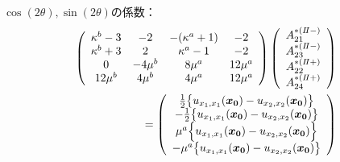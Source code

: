 $\cos(2\theta),\sin(2\theta)$の係数：
\begin{align}
	\left(
	\begin{array}{cccc}
		\kappa^b-3& -2 & -(\kappa^a+1) & -2 \\
		\kappa^b+3 & 2 & \kappa^a-1 & -2 \\
		0 & -4\mu^{b} & 8\mu^{a} & 12\mu^{a} \\
		12\mu^{b} & 4\mu^{b} & 4\mu^{a} & 12\mu^{a} \\
	\end{array}
	\right)
	\left(
	\begin{array}{c}
		A_{21}^{*(I\hspace{-.15em}I-)} \\
	 	A_{23}^{*(I\hspace{-.15em}I-)} \\
		A_{22}^{*(I\hspace{-.15em}I+)}\\
	 	A_{24}^{*(I\hspace{-.15em}I+)} \\
	\end{array}
	\right)
	\nonumber
	\\
	=
	\left(
	\begin{array}{c}
		\frac{1}{2}\bigl\{u_{x_{1},x_{1}}(\bm{x_{0}})-u_{x_{2},x_{2}}(\bm{x_{0}})\bigr\} \\
	 	-\frac{1}{2}\bigl\{u_{x_{1},x_{1}}(\bm{x_{0}})-u_{x_{2},x_{2}}(\bm{x_{0}})\bigr\} \\
		\mu^a\Bigl\{ u_{x_{1},x_{1}}(\bm{x_{0}})- u_{x_{2},x_{2}}(\bm{x_{0}})\Bigr\} \\
	 	-\mu^a \bigl\{u_{x_{1},x_{1}}(\bm{x_{0}})-u_{x_{2},x_{2}}(\bm{x_{0}})\bigr\} \\
	\end{array}
	\right)
\end{align}
